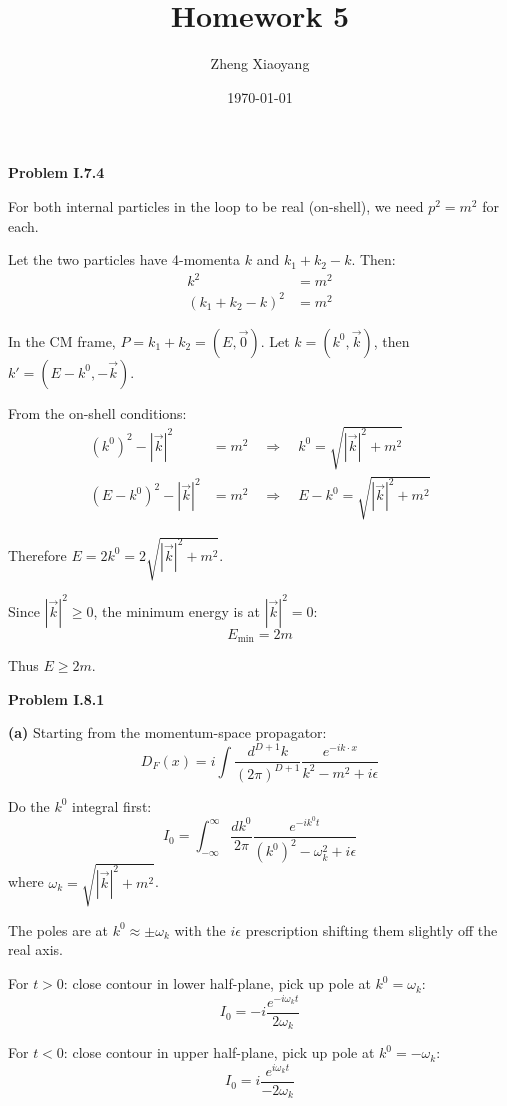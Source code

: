 \documentclass[11pt]{article}
\title{Homework 5}
\author{Zheng Xiaoyang}
\date{\today}
\begin{document}
\maketitle

\noindent\textbf{Problem I.7.4}

\medskip
\noindent
For both internal particles in the loop to be real (on-shell), we need $p^2 = m^2$ for each.

Let the two particles have 4-momenta $k$ and $k_1 + k_2 - k$. Then:
\begin{align*}
    k^2 &= m^2 \\
    (k_1 + k_2 - k)^2 &= m^2
\end{align*}

In the CM frame, $P = k_1 + k_2 = (E, \vec{0})$. Let $k = (k^0, \vec{k})$, then $k' = (E - k^0, -\vec{k})$.

From the on-shell conditions:
\begin{align*}
    (k^0)^2 - |\vec{k}|^2 &= m^2 \quad \Rightarrow \quad k^0 = \sqrt{|\vec{k}|^2 + m^2} \\
    (E - k^0)^2 - |\vec{k}|^2 &= m^2 \quad \Rightarrow \quad E - k^0 = \sqrt{|\vec{k}|^2 + m^2}
\end{align*}

Therefore $E = 2k^0 = 2\sqrt{|\vec{k}|^2 + m^2}$.

Since $|\vec{k}|^2 \ge 0$, the minimum energy is at $|\vec{k}|^2 = 0$:
$$E_{\text{min}} = 2m$$

Thus $\boxed{E \ge 2m}$.

\bigskip
\noindent\textbf{Problem I.8.1}

\medskip
\noindent
\textbf{(a)} Starting from the momentum-space propagator:
\[ D_F(x) = i \int \frac{d^{D+1}k}{(2\pi)^{D+1}} \frac{e^{-ik \cdot x}}{k^2 - m^2 + i\epsilon} \]

Do the $k^0$ integral first:
\[ I_0 = \int_{-\infty}^{\infty} \frac{dk^0}{2\pi} \frac{e^{-ik^0 t}}{(k^0)^2 - \omega_k^2 + i\epsilon} \]
where $\omega_k = \sqrt{|\vec{k}|^2 + m^2}$.

The poles are at $k^0 \approx \pm\omega_k$ with the $i\epsilon$ prescription shifting them slightly off the real axis.

For $t > 0$: close contour in lower half-plane, pick up pole at $k^0 = \omega_k$:
\[ I_0 = -i \frac{e^{-i\omega_k t}}{2\omega_k} \]

For $t < 0$: close contour in upper half-plane, pick up pole at $k^0 = -\omega_k$:
\[ I_0 = i \frac{e^{i\omega_k t}}{-2\omega_k} \]
\end{document}
